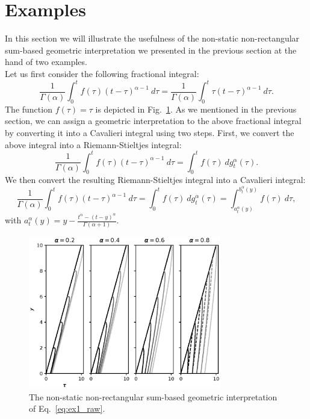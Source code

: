 \documentclass{article}
\theoremstyle{theorem}
\theoremstyle{definition}
\begin{document}
\section{Examples}
In this section we will illustrate the usefulness of the non-static non-rectangular sum-based geometric interpretation we presented in the previous section at the 
hand of two examples.\\

\noindent
Let us first consider the following fractional integral:
\begin{equation}
\label{eq:ex1_raw}
\frac{1}{\Gamma(\alpha)}\int_0^t f(\tau) (t-\tau)^{\alpha-1}~d\tau = \frac{1}{\Gamma(\alpha)}\int_0^t \tau(t-\tau)^{\alpha-1}~d\tau. 
\end{equation}
The function $f(\tau) =\tau$ is depicted in Fig.~\ref{fig:geo1}. As we mentioned in the previous section, we can assign a geometric interpretation to the above fractional integral by converting it into a Cavalieri integral using two steps. First, we convert 
the above integral into a Riemann-Stieltjes integral:
\begin{equation}
\frac{1}{\Gamma(\alpha)}\int_0^t f(\tau) (t-\tau)^{\alpha-1}~d\tau = \int_0^t f(\tau)~dg_t^{\alpha}(\tau). 
\end{equation}
We then convert the resulting Riemann-Stieltjes integral into a Cavalieri integral:
\begin{equation}
\label{eq:ex1}
\frac{1}{\Gamma(\alpha)}\int_0^t f(\tau) (t-\tau)^{\alpha-1}~d\tau = \int_0^t f(\tau)~dg_t^{\alpha}(\tau)=\int_{a_t^{\alpha}(y)}^{b_t^{\alpha}(y)} f(\tau)~d\tau,
\end{equation}
with $a_t^{\alpha}(y) = y - \frac{t^{\alpha}-(t-y)^{\alpha}}{\Gamma(\alpha+1)}.$

\begin{figure}[htb]
\centering
\includegraphics[width=0.75\textwidth]{geo_int1.eps}
\caption{The non-static non-rectangular sum-based geometric interpretation of Eq.~\eqref{eq:ex1_raw}.}
\label{fig:geo1}
\end{figure}
\end{document}
